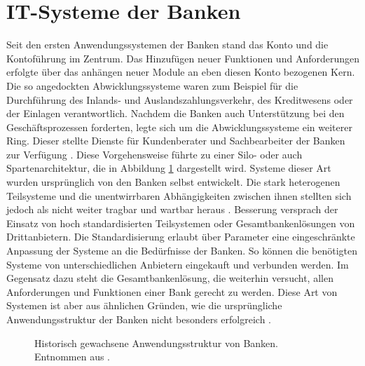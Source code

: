 \documentclass[12pt,oneside,a4paper,parskip]{scrbook}
\begin{document}
\section{IT-Systeme der Banken}
Seit den ersten Anwendungssystemen der Banken stand das Konto und die Kontoführung im Zentrum. Das Hinzufügen neuer Funktionen und Anforderungen erfolgte über das anhängen neuer Module an eben diesen Konto bezogenen Kern. Die so angedockten Abwicklungssysteme waren zum Beispiel für die Durchführung des Inlands- und Auslandszahlungsverkehr, des Kreditwesens oder der Einlagen verantwortlich. Nachdem die Banken auch Unterstützung bei den Geschäftsprozessen forderten, legte sich um die Abwicklungssysteme ein weiterer Ring. Dieser stellte Dienste für Kundenberater und Sachbearbeiter der Banken zur Verfügung \cite[18-20]{ITidF}\cite{SuPdIiB}. Diese Vorgehensweise führte zu einer Silo- oder auch Spartenarchitektur, die in Abbildung \ref{zwiebel} dargestellt wird. Systeme dieser Art wurden ursprünglich von den Banken selbst entwickelt. Die stark heterogenen Teilsysteme und die unentwirrbaren Abhängigkeiten zwischen ihnen stellten sich jedoch als nicht weiter tragbar und wartbar heraus \cite{bankEnzy}\cite{SuPdIiB}\cite[52]{ITidF}. Besserung versprach der Einsatz von hoch standardisierten Teilsystemen oder Gesamtbankenlösungen von Drittanbietern. Die Standardisierung erlaubt über Parameter eine eingeschränkte Anpassung der Systeme an die Bedürfnisse der Banken. So können die benötigten Systeme von unterschiedlichen Anbietern eingekauft und verbunden werden. Im Gegensatz dazu steht die Gesamtbankenlösung, die weiterhin versucht, allen Anforderungen und Funktionen einer Bank gerecht zu werden. Diese Art von Systemen ist aber aus ähnlichen Gründen, wie die ursprüngliche Anwendungsstruktur der Banken nicht besonders erfolgreich \cite[S. 56 ff.]{ITidF}. 

\begin{figure}
  \caption[Historische Anwendungsstruktur von Banken]{Historisch gewachsene Anwendungsstruktur von Banken. Entnommen aus \cite{SuPdIiB}.}
  \label{zwiebel}
\end{figure}
\end{document}
